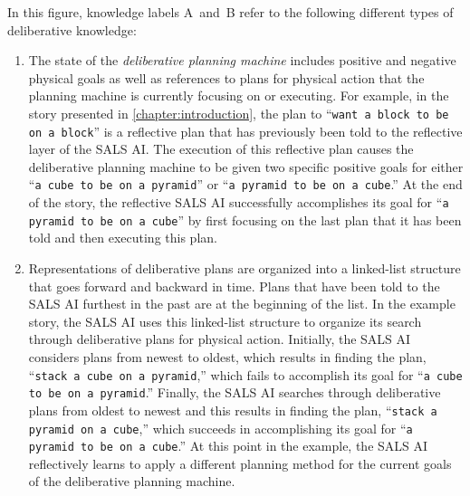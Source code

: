 In this figure, knowledge labels {\mbox{A~and~B}} refer to the
following different types of deliberative knowledge:
\begin{enumerate}[~~A.]
\item The state of the {\emph{deliberative planning machine}} includes
  positive and negative physical goals as well as references to plans
  for physical action that the planning machine is currently focusing
  on or executing.  For example, in the story presented in
  {\mbox{\autoref{chapter:introduction}}}, the plan to ``{\tt{want a
      block to be on a block}}'' is a reflective plan that has
  previously been told to the reflective layer of the SALS AI.  The
  execution of this reflective plan causes the deliberative planning
  machine to be given two specific positive goals for either ``{\tt{a
      cube to be on a pyramid}}'' or ``{\tt{a pyramid to be on a
      cube}}.''  At the end of the story, the reflective SALS AI
  successfully accomplishes its goal for ``{\tt{a pyramid to be on a
      cube}}'' by first focusing on the last plan that it has been
  told and then executing this plan.
\item Representations of deliberative plans are organized into a
  linked-list structure that goes forward and backward in time.  Plans
  that have been told to the SALS AI furthest in the past are at the
  beginning of the list.  In the example story, the SALS AI uses this
  linked-list structure to organize its search through deliberative
  plans for physical action.  Initially, the SALS AI considers plans
  from newest to oldest, which results in finding the plan,
  ``{\tt{stack a cube on a pyramid}},'' which fails to accomplish its
  goal for ``{\tt{a cube to be on a pyramid}}.''  Finally, the SALS AI
  searches through deliberative plans from oldest to newest and this
  results in finding the plan, ``{\tt{stack a pyramid on a cube}},''
  which succeeds in accomplishing its goal for ``{\tt{a pyramid to be
      on a cube}}.''  At this point in the example, the SALS AI
  reflectively learns to apply a different planning method for the
  current goals of the deliberative planning machine.
\end{enumerate}
